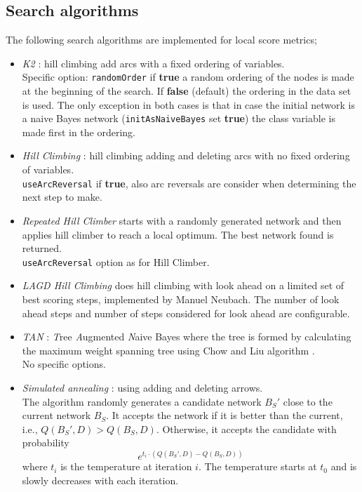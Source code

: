 \documentclass[a4paper]{article}
\begin{document}
\subsection{Search algorithms \label{sec.score.search}}

The following search algorithms are implemented for local score metrics;
\begin{itemize}
\item \textit{K2} \cite{CooperHerskovits1992}: 
hill climbing add arcs with a fixed ordering of variables.\\
Specific option: {\tt randomOrder} if {\bf true} a random ordering of
the nodes is made at the beginning of the search. If {\bf false} (default)
the ordering in the data set is used. The only exception in both cases is that
in case the initial network is a naive Bayes network ({\tt initAsNaiveBayes}
set \textbf{true}) the class variable is made first in the ordering.
\item \textit{Hill Climbing} 
\cite{Buntine1996}: 
hill climbing adding and deleting arcs with no fixed ordering of variables.\\
{\tt useArcReversal} if \textbf{true}, also arc reversals are consider when determining
the next step to make.
\item \textit{Repeated Hill Climber} starts with a randomly generated network and
then applies hill climber to reach a local optimum. The best network found is
returned.\\
{\tt useArcReversal} option as for Hill Climber.
\item \textit{LAGD Hill Climbing} does hill climbing with look ahead on a limited set of 
best scoring steps, implemented by Manuel Neubach. The number of look ahead steps and number of steps considered
for look ahead are configurable.
\item \textit{TAN} \cite{ChengGreiner1999,friedman97}:
\textit{T}ree \textit{A}ugmented \textit{N}aive Bayes where the tree is formed by calculating the
maximum weight spanning tree using Chow and Liu algorithm \cite{chow1968}.\\
No specific options.
\item \textit{Simulated annealing} \cite{bouck1995}:
using adding and deleting arrows.\\
The algorithm randomly generates a candidate network $B_S'$ close to the current
network $B_S$. It accepts the network if it is better than the current, i.e.,
$Q(B_S',D) > Q(B_S,D)$. 
Otherwise, it accepts the candidate with probability 
$$e^{t_i \cdot(Q(B_S',D) -Q(B_S,D))}$$
where $t_i$ is the temperature at iteration $i$.
The temperature starts at $t_0$ and is slowly decreases with each iteration. 


\end{itemize}
\end{document}
